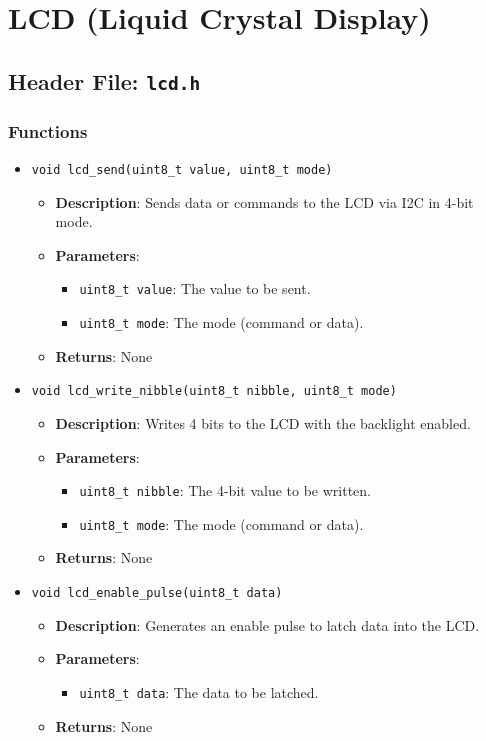 \documentclass{article}
\begin{document}
\section{LCD (Liquid Crystal Display)}

\subsection{Header File: \texttt{lcd.h}}

\subsubsection{Functions}

\begin{itemize}
   \item \texttt{void lcd\_send(uint8\_t value, uint8\_t mode)}
   \begin{itemize}
      \item \textbf{Description}: Sends data or commands to the LCD via I2C in 4-bit mode.
      \item \textbf{Parameters}:
      \begin{itemize}
         \item \texttt{uint8\_t value}: The value to be sent.
         \item \texttt{uint8\_t mode}: The mode (command or data).
      \end{itemize}
      \item \textbf{Returns}: None
   \end{itemize}

   \item \texttt{void lcd\_write\_nibble(uint8\_t nibble, uint8\_t mode)}
   \begin{itemize}
      \item \textbf{Description}: Writes 4 bits to the LCD with the backlight enabled.
      \item \textbf{Parameters}:
      \begin{itemize}
         \item \texttt{uint8\_t nibble}: The 4-bit value to be written.
         \item \texttt{uint8\_t mode}: The mode (command or data).
      \end{itemize}
      \item \textbf{Returns}: None
   \end{itemize}

   \item \texttt{void lcd\_enable\_pulse(uint8\_t data)}
   \begin{itemize}
      \item \textbf{Description}: Generates an enable pulse to latch data into the LCD.
      \item \textbf{Parameters}:
      \begin{itemize}
         \item \texttt{uint8\_t data}: The data to be latched.
      \end{itemize}
      \item \textbf{Returns}: None
   \end{itemize}


\end{itemize}
\end{document}
